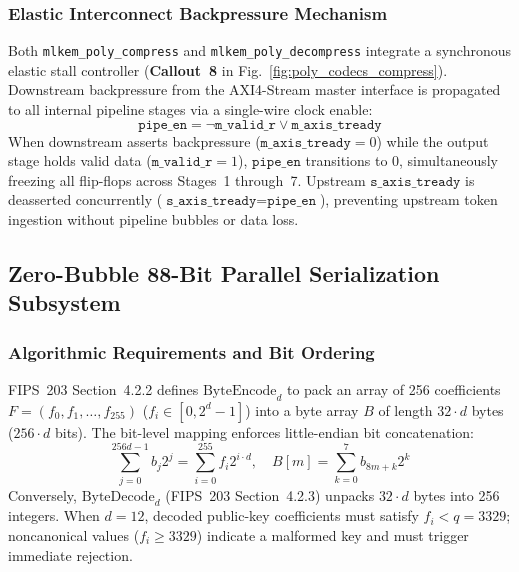 \subsubsection{Elastic Interconnect Backpressure Mechanism}
Both \texttt{mlkem\_poly\_compress} and \texttt{mlkem\_poly\_decompress} integrate a synchronous elastic stall controller (\textbf{Callout~8} in Fig.~\ref{fig:poly_codecs_compress}). Downstream backpressure from the AXI4-Stream master interface is propagated to all internal pipeline stages via a single-wire clock enable:
\begin{equation}
\label{eq:codec_pipe_en}
\texttt{pipe\_en} = \neg \texttt{m\_valid\_r} \lor \texttt{m\_axis\_tready}
\end{equation}
When downstream asserts backpressure ($\texttt{m\_axis\_tready} = 0$) while the output stage holds valid data ($\texttt{m\_valid\_r} = 1$), $\texttt{pipe\_en}$ transitions to 0, simultaneously freezing all flip-flops across Stages~1 through~7. Upstream $\texttt{s\_axis\_tready}$ is deasserted concurrently ($\texttt{s\_axis\_tready} = \texttt{pipe\_en}$), preventing upstream token ingestion without pipeline bubbles or data loss.

\subsection{Zero-Bubble 88-Bit Parallel Serialization Subsystem}
\label{sec:zero_bubble_serialization}

\subsubsection{Algorithmic Requirements and Bit Ordering}
FIPS~203 Section~4.2.2 defines $\text{ByteEncode}_d$ to pack an array of 256 coefficients $F = (f_0, f_1, \dots, f_{255})$ ($f_i \in [0, 2^d - 1]$) into a byte array $B$ of length $32 \cdot d$ bytes ($256 \cdot d$ bits). The bit-level mapping enforces little-endian bit concatenation:
\begin{equation}
\label{eq:codec_byte_encode_bits}
\sum_{j=0}^{256d - 1} b_j 2^j = \sum_{i=0}^{255} f_i 2^{i \cdot d}, \quad B[m] = \sum_{k=0}^{7} b_{8m+k} 2^k
\end{equation}
Conversely, $\text{ByteDecode}_d$ (FIPS~203 Section~4.2.3) unpacks $32 \cdot d$ bytes into 256 integers. When $d = 12$, decoded public-key coefficients must satisfy $f_i < q = 3329$; noncanonical values ($f_i \ge 3329$) indicate a malformed key and must trigger immediate rejection.

